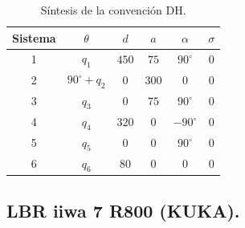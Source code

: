 \documentclass[a4paper,12pt]{article}
\begin{document}
\begin{table}[H]
    \centering
    \begin{tabular}{|c|c|c|c|c|c|}
    \hline
    Sistema & $\theta$          & $d$    & $a$   & $\alpha$    & $\sigma$ \\ \hline
    1       & $q_1$             & $450$  & $75$  & $90^\circ$  & 0        \\ \hline
    2       & $90^\circ + q_2$  & $0$    & $300$ & $0$         & 0        \\ \hline
    3       & $q_3$             & $0$    & $75$  & $90^\circ$  & 0        \\ \hline
    4       & $q_4$             & $320$  & $0$   & $-90^\circ$ & 0        \\ \hline
    5       & $q_5$             & $0$    & $0$   & $90^\circ$  & 0        \\ \hline
    6       & $q_6$             & $80$   & $0$   & $0$         & 0        \\ \hline
    \end{tabular}
    \caption{Síntesis de la convención DH.}
    \label{sintesis DH FANUC}
\end{table}

\subsection{LBR iiwa 7 R800 (KUKA).}
\end{document}
